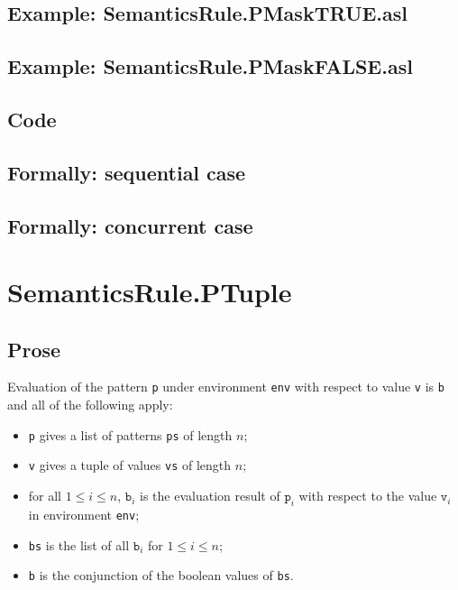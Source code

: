 \documentclass{book}
\begin{document}
    \subsection{Example: SemanticsRule.PMaskTRUE.asl}

    \subsection{Example: SemanticsRule.PMaskFALSE.asl}

  \subsection{Code}

\begin{emptyformal}
  \subsection{Formally: sequential case}

  \subsection{Formally: concurrent case}
\end{emptyformal}


\section{SemanticsRule.PTuple \label{sec:SemanticsRule.PTuple}}

    \subsection{Prose}
    Evaluation of the pattern \texttt{p} under environment \texttt{env} with
    respect to value \texttt{v} is \texttt{b} and all of the following apply:
    \begin{itemize}
      \item \texttt{p} gives a list of patterns \texttt{ps} of length $n$;
      \item \texttt{v} gives a tuple of values \texttt{vs} of length $n$;
      \item for all $1 \leq i \leq n$, $\texttt{b}_i$ is the evaluation result
        of $\texttt{p}_i$ with respect to the value $\texttt{v}_i$ in
        environment \texttt{env};
      \item \texttt{bs} is the list of all $\texttt{b}_i$ for $1 \leq i \leq n$;
      \item \texttt{b} is the conjunction of the boolean values of \texttt{bs}.
    \end{itemize}
\end{document}
